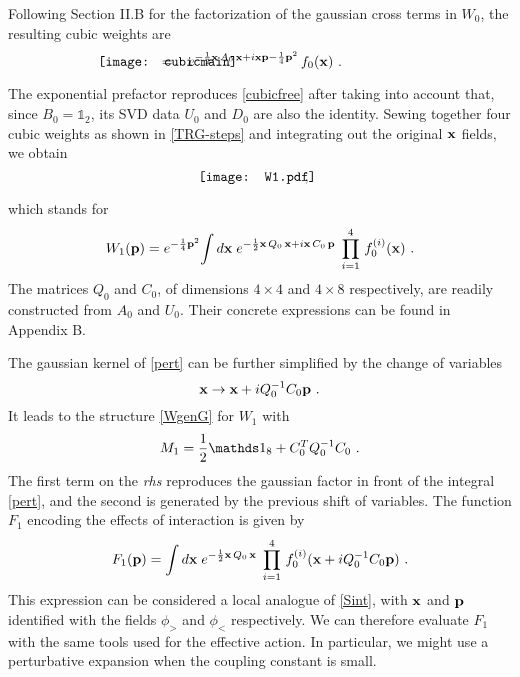 \documentclass[a4paper,preprintnumbers,nofootinbib,twocolumn]{quantumarticle}
\newcommand{\be}{\begin{equation}} \newcommand{\ee}{\end{equation}}
\newcommand{\id}{\mathds 1}
\begin{document}
Following Section II.B for the factorization of the gaussian cross terms in $W_0$, 
the resulting cubic weights are
\vspace*{-3.6cm}
\begin{equation}
\hspace{-20mm} \vcenter{\hbox{\texttt{[image: cubicmain]}}} \hspace{-20mm}  =\;\;\; e^{-{1\over 2} {\bf x} \, A_0 \,{\bf x} +i {\bf x} {\bf p} -{1\over 4} {\bf p}^2 } \, f_0({\bf x}) \ .
\label{cubic0int}
\end{equation}
\vspace*{-3.8cm}

\noindent The exponential prefactor reproduces \eqref{cubicfree} after taking into account that, since $B_0=\id_2$, its SVD data $U_0$ and $D_0$ are also the identity. 
Sewing together four cubic weights as shown in \eqref{TRG-steps}  and integrating out the original ${\bf x}$ fields, we obtain 
\vspace*{-3.3cm}
\begin{equation}
  \vcenter{\hbox{\texttt{[image: W1.pdf]}}}    \hspace{-4mm} \ , \hspace{3mm}
\label{TRGfig3}
\end{equation}
\vspace*{-3.3cm}


\noindent which stands for 
\be
W_1({\bf p})=e^{-{1 \over 4} {\bf p}^2} \! \int d {\bf x}\;  e^{-{1 \over 2} {\bf x} \, Q_0 \, {\bf x} + i {\bf x} \, C_0 \, {\bf p}} \; \prod_{i=1}^4 \, f_{0}^{(i)}({\bf x}) \ .
\label{pert}
\ee
The matrices $Q_0$ and $C_0$, of dimensions $4 \times 4$ and $4 \times 8$ respectively, are readily constructed from $A_0$ and $U_0$.
Their concrete expressions  
can be found in Appendix B. 

The gaussian kernel of \eqref{pert} can be further simplified by the change of variables
\be
{\bf x} \to {\bf x} +i Q_0^{-1} C_0 {\bf p} \ .
\label{pert2}
\ee
It leads to the structure \eqref{WgenG} for $W_1$ with
\be
M_1= {1 \over 2} \id_8 +C_0^T Q_0^{-1} C_0 \ .
\label{pert1}
\ee
The first term on the {\it rhs} reproduces the gaussian factor in front of the integral \eqref{pert}, and the second is generated by the previous shift of variables. 
The function $F_1$ encoding the effects of interaction is given by
\be
F_1({\bf p})=\int d {\bf x}\;  e^{-{1 \over 2} {\bf x} \, Q_0 \, {\bf x}} \; \prod_{i=1}^4 \, f_{0}^{(i)}({\bf x}+i Q_0^{-1} C_0 {\bf p} ) \ .
\label{F1}
\ee
This expression can be considered a local analogue of  \eqref{Sint}, with ${\bf x}$ and ${\bf p}$ identified with the fields $\phi_>$ and $\phi_<$ respectively.
We can therefore evaluate $F_1$ with the same tools used for the effective action. In particular, we might use a perturbative expansion
when the coupling constant is small.
\end{document}
